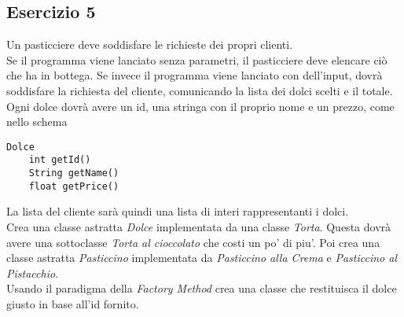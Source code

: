 \documentclass{article}
\begin{document}
\newpage

\subsection*{Esercizio 5}
Un pasticciere deve soddisfare le richieste dei propri clienti. \\
Se il programma viene lanciato senza parametri, il pasticciere deve elencare
ciò che ha in bottega. Se invece il programma viene lanciato con dell'input,
dovrà soddisfare la richiesta del cliente, comunicando la lista dei dolci 
scelti e il totale. \\
Ogni dolce dovrà avere un id, una stringa con il proprio nome e un prezzo, come
nello schema
\begin{verbatim}
Dolce
    int getId()
    String getName()
    float getPrice()
\end{verbatim}
La lista del cliente sarà quindi una lista di
interi rappresentanti i dolci. \\
Crea una classe astratta \textit{Dolce} implementata da una classe
\textit{Torta}. Questa dovrà avere una sottoclasse \textit{Torta al cioccolato}
che costi un po' di piu'. Poi crea una classe astratta \textit{Pasticcino}
implementata da \textit{Pasticcino alla Crema} e \textit{Pasticcino al
Pistacchio}. \\
Usando il paradigma della \textit{Factory Method} crea una classe che
restituisca il dolce giusto in base all'id fornito.
\end{document}
